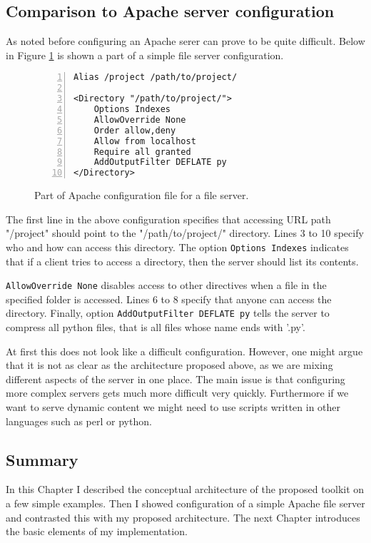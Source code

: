 \documentclass[12pt,a4paper]{article}
\begin{document}
\subsection{Comparison to Apache server configuration}
As noted before configuring an Apache serer can prove to be quite difficult.
Below in Figure \ref{fig:apache} is shown a part of a simple file server
configuration.
\begin{figure}[h]
\centering
\begin{lstlisting}[numbers=left]
Alias /project /path/to/project/

<Directory "/path/to/project/">
    Options Indexes
    AllowOverride None
    Order allow,deny
    Allow from localhost
    Require all granted
    AddOutputFilter DEFLATE py
</Directory>
\end{lstlisting}
\caption[scale=1.0]{Part of Apache configuration file for a file server.}
\label{fig:apache}
\end{figure}
The first line in the above configuration specifies that accessing URL 
path "/project" should point to the "/path/to/project/" directory.
Lines 3 to 10 specify who and how can access this directory.
The option \texttt{Options Indexes} indicates that if a client tries
to access a directory, then the server should list its contents.

\texttt{AllowOverride None} disables access to other directives when 
a file in the specified folder is accessed. Lines 6 to 8 specify that
anyone can access the directory. Finally, option 
\texttt{AddOutputFilter DEFLATE py} tells the server to compress
all python files, that is all files whose name ends with '.py'.

At first this does not look like a difficult configuration. However, 
one might argue that it is not as clear as the architecture proposed above,
as we are mixing different aspects of the server in one place.
The main issue is that configuring more complex servers gets much more 
difficult very quickly. Furthermore if we want to serve dynamic content
we might need to use scripts written in other languages such as perl or python.

\subsection{Summary}
In this Chapter I described the conceptual architecture of the proposed
toolkit on a few simple examples. Then I showed configuration of a simple
Apache file server and contrasted this with my proposed architecture.
The next Chapter introduces the basic elements of my implementation.
\end{document}

